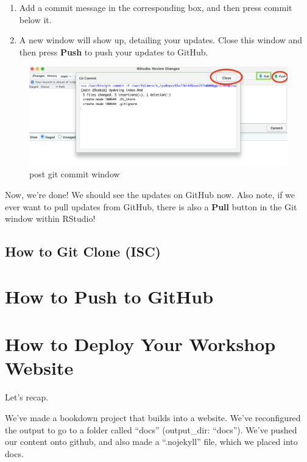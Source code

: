 \documentclass[
]{book}
\theoremstyle{definition}
\theoremstyle{definition}
\theoremstyle{definition}
\theoremstyle{definition}
\theoremstyle{remark}
\begin{document}
\begin{enumerate}
\def\labelenumi{\arabic{enumi}.}
\setcounter{enumi}{14}
\item
  Add a commit message in the corresponding box, and then press commit below it.
\item
  A new window will show up, detailing your updates. Close this window and then press \textbf{Push} to push your updates to GitHub.
\end{enumerate}

\begin{figure}
\centering
\includegraphics{img/git-instruct/git-window-post-commit.png}
\caption{post git commit window}
\end{figure}

Now, we're done! We should see the updates on GitHub now. Also note, if we ever want to pull updates from GitHub, there is also a \textbf{Pull} button in the Git window within RStudio!

\section{How to Git Clone (ISC)}\label{how-to-git-clone-isc}

\chapter{How to Push to GitHub}\label{how-to-push-to-github}

\chapter{How to Deploy Your Workshop Website}\label{how-to-deploy-your-workshop-website}

Let's recap.

We've made a bookdown project that builds into a website. We've reconfigured the output to go to a folder called ``docs'' (output\_dir: ``docs''). We've pushed our content onto github, and also made a ``.nojekyll'' file, which we placed into docs.
\end{document}
